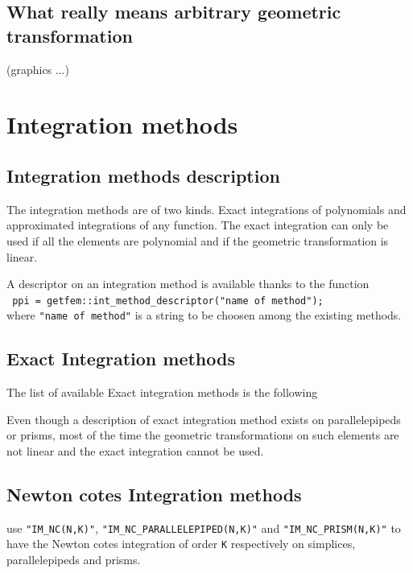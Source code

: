 \documentclass[11pt,a4paper]{article}
\begin{document}
\subsection{What really means arbitrary geometric transformation}

(graphics ...)

\section{Integration methods}

\subsection{Integration methods description}

The integration methods are of two kinds. Exact integrations of polynomials and approximated integrations of any function. The exact integration can only be used if all the elements are polynomial and if the geometric transformation is linear.

 A descriptor on an integration method is available thanks to the function\\[0.5cm]
{\tt
  ppi = getfem::int\_method\_descriptor("name of method");
}\\[0.5cm]
where {\tt "name of method"} is a string to be choosen among the existing methods.

\subsection{Exact Integration methods}

The list of available Exact integration methods is the following



Even though a description of exact integration method exists on parallelepipeds or prisms, most of the time the geometric transformations on such elements are not linear and the exact integration cannot be used.

\subsection{Newton cotes Integration methods}

use {\tt "IM\_NC(N,K)"}, {\tt "IM\_NC\_PARALLELEPIPED(N,K)"}
and {\tt "IM\_NC\_PRISM(N,K)"} to have the Newton cotes integration of order {\tt K} respectively on simplices, parallelepipeds and prisms.
\end{document}
